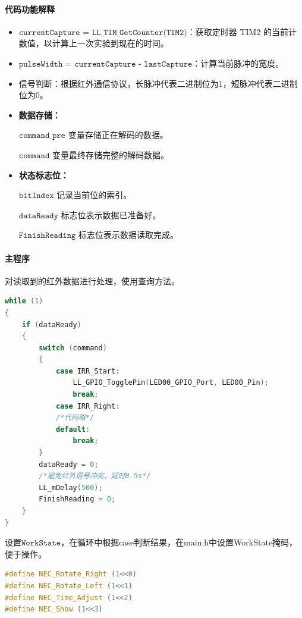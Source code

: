 \documentclass{article}
\begin{document}
\paragraph{代码功能解释}
\begin{itemize}
    \item $\texttt{currentCapture = LL\_TIM\_GetCounter(TIM2)}$：获取定时器 TIM2 的当前计数值，以计算上一次实验到现在的时间。
    \item $\texttt{pulseWidth = currentCapture - lastCapture}$：计算当前脉冲的宽度。
    \item 信号判断：根据红外通信协议，长脉冲代表二进制位为1，短脉冲代表二进制位为0。
    \item \textbf{数据存储：}\par
    $\texttt{command\_pre}$ 变量存储正在解码的数据。\par
    $\texttt{command}$ 变量最终存储完整的解码数据。\par
    \item \textbf{状态标志位：}\par
    $\texttt{bitIndex}$ 记录当前位的索引。\par
    $\texttt{dataReady}$ 标志位表示数据已准备好。\par
    $\texttt{FinishReading}$ 标志位表示数据读取完成。\par
\end{itemize}
\paragraph{主程序}对读取到的红外数据进行处理，使用查询方法。
\begin{multicols}{2}
\begin{lstlisting}[language=c]
while (1)
{
    if (dataReady)
    {
        switch (command)
        {
            case IRR_Start:
                LL_GPIO_TogglePin(LED00_GPIO_Port, LED00_Pin);
                break;
            case IRR_Right:
            /*代码略*/  
            default:
                break;
        }
        dataReady = 0;
        /*避免红外信号冲突，延时0.5s*/
        LL_mDelay(500);
        FinishReading = 0;
    }
}
\end{lstlisting}
\end{multicols}
设置$\texttt{WorkState}$，在循环中根据case判断结果，在main.h中设置WorkState掩码，便于操作。
\begin{multicols}{3}
\begin{lstlisting}[language=c]
#define NEC_Rotate_Right (1<<0)
#define NEC_Rotate_Left (1<<1)
#define NEC_Time_Adjust (1<<2)
#define NEC_Show (1<<3)
\end{lstlisting}
\end{multicols}
\end{document}
